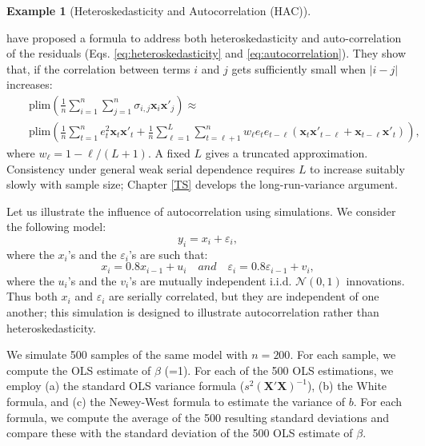 \documentclass[
  11pt,
]{book}
\theoremstyle{definition}
\theoremstyle{definition}
\newtheorem{example}{Example}[chapter]
\theoremstyle{definition}
\theoremstyle{definition}
\theoremstyle{remark}
\begin{document}
\begin{example}[Heteroskedasticity and Autocorrelation (HAC)]
\protect\hypertarget{exm:HCheterAC}{}\label{exm:HCheterAC}

\citet{Newey_West_1987} have proposed a formula to address both heteroskedasticity and auto-correlation of the residuals (Eqs. \eqref{eq:heteroskedasticity} and \eqref{eq:autocorrelation}). They show that, if the correlation between terms \(i\) and \(j\) gets sufficiently small when \(|i-j|\) increases:
\begin{eqnarray}
&&\mbox{plim} \left( \frac{1}{n}\sum_{i=1}^{n}\sum_{j=1}^{n}\sigma_{i,j}\mathbf{x}_i\mathbf{x}'_j \right) \approx  \\
&&\mbox{plim} \left( \frac{1}{n}\sum_{t=1}^{n}e_{t}^2\mathbf{x}_t\mathbf{x}'_t +
\frac{1}{n}\sum_{\ell=1}^{L}\sum_{t=\ell+1}^{n}w_\ell e_{t}e_{t-\ell}(\mathbf{x}_t\mathbf{x}'_{t-\ell} + \mathbf{x}_{t-\ell}\mathbf{x}'_{t})
\right), \nonumber \label{eq:NW}
\end{eqnarray}
where \(w_\ell = 1 - \ell/(L+1)\). A fixed \(L\) gives a truncated approximation. Consistency under general weak serial dependence requires \(L\) to increase suitably slowly with sample size; Chapter \ref{TS} develops the long-run-variance argument.

Let us illustrate the influence of autocorrelation using simulations. We consider the following model:
\begin{equation}
y_i = x_i + \varepsilon_i,\label{eq:simul11}
\end{equation}
where the \(x_i\)'s and the \(\varepsilon_i\)'s are such that:
\begin{equation}
x_i = 0.8 x_{i-1} + u_i \quad and \quad \varepsilon_i = 0.8 \varepsilon_{i-1} + v_i, \label{eq:simul22}
\end{equation}
where the \(u_i\)'s and the \(v_i\)'s are mutually independent i.i.d. \(\mathcal{N}(0,1)\) innovations. Thus both \(x_i\) and \(\varepsilon_i\) are serially correlated, but they are independent of one another; this simulation is designed to illustrate autocorrelation rather than heteroskedasticity.

We simulate 500 samples of the same model with \(n=200\). For each sample, we compute the OLS estimate of \(\beta\) (=1). For each of the 500 OLS estimations, we employ (a) the standard OLS variance formula (\(s^2 (\mathbf{X}'\mathbf{X})^{-1}\)), (b) the White formula, and (c) the Newey-West formula to estimate the variance of \(b\). For each formula, we compute the average of the 500 resulting standard deviations and compare these with the standard deviation of the 500 OLS estimate of \(\beta\).


\end{example}
\end{document}
